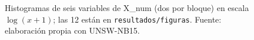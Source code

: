 \begin{figure}[htbp]
  \centering
  \caption[Histogramas de variables de X\_num en escala logarítmica]{Histogramas de seis variables de X\_num (dos por bloque) en escala $\log(x+1)$; las 12 están en \texttt{resultados/figuras}. Fuente: elaboración propia con UNSW-NB15.}
  \label{fig:hist}
\end{figure}
